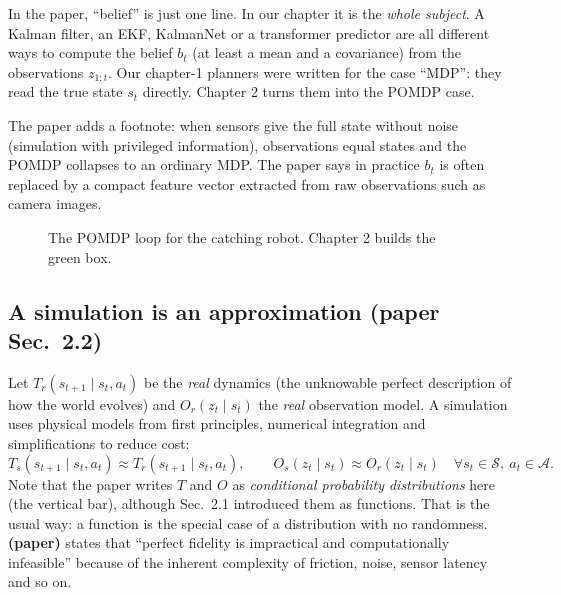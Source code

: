 \documentclass[11pt,a4paper]{article}
\begin{document}
\begin{idea}
In the paper, ``belief'' is just one line. In our chapter it is the \emph{whole subject}. A
Kalman filter, an EKF, KalmanNet or a transformer predictor are all different ways to compute
the belief $b_t$ (at least a mean and a covariance) from the observations $z_{1:t}$. Our
chapter-1 planners were written for the case ``MDP'': they read the true state $s_t$ directly.
Chapter 2 turns them into the POMDP case.
\end{idea}

The paper adds a footnote: when sensors give the full state without noise (simulation with
privileged information), observations equal states and the POMDP collapses to an ordinary MDP.
The paper says in practice $b_t$ is often replaced by a compact feature vector extracted from raw
observations such as camera images.

\begin{figure}[H]
\centering
{}
\caption{The POMDP loop for the catching robot. Chapter 2 builds the green box.}
\end{figure}

\subsection{A simulation is an approximation \textnormal{(paper Sec.~2.2)}}

Let $T_r(s_{t+1}\mid s_t,a_t)$ be the \emph{real} dynamics (the unknowable perfect description of
how the world evolves) and $O_r(z_t\mid s_t)$ the \emph{real} observation model. A simulation uses
physical models from first principles, numerical integration and simplifications to reduce cost:
\[
T_s(s_{t+1}\mid s_t,a_t)\approx T_r(s_{t+1}\mid s_t,a_t),\qquad
O_s(z_t\mid s_t)\approx O_r(z_t\mid s_t)\quad \forall s_t\in\mathcal S,\ a_t\in\mathcal A.
\]
Note that the paper writes $T$ and $O$ as \emph{conditional probability distributions} here (the
vertical bar), although Sec.~2.1 introduced them as functions. That is the usual way: a
function is the special case of a distribution with no randomness. \textbf{(paper)} states that
``perfect fidelity is impractical and computationally infeasible'' because of the inherent
complexity of friction, noise, sensor latency and so on.
\end{document}
